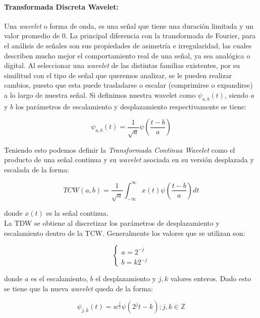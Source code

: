 \documentclass[11pt]{article}
\begin{document}
\paragraph*{Transformada Discreta Wavelet:}
Una {\it wavelet} o forma de onda, es una señal que tiene una duración limitada y un valor promedio de 0. La principal diferencia con la transformada de Fourier, para el análisis de señales son sus propiedades de asimetría e irregularidad, las cuales describen 
mucho mejor el comportamiento real de una señal, ya sea analógica o digital. Al seleccionar una {\it wavelet} de las distintas familias existentes, por su similitud con el tipo de señal que queremos analizar, se le pueden realizar cambios, puesto que esta puede trasladarse 
o escalar (comprimirse o expandirse) a lo largo de nuestra señal. Si definimos nuestra wavelet como \(\psi_{a, b}(t)\), siendo \(a\) y \(b\) los parámetros de escalamiento y desplazamiento respectivamente se tiene:

\begin{equation*}
    \psi_{a,b}(t) = \frac{1}{\sqrt{a}}\psi(\frac{t - b}{a})
\end{equation*}

Teniendo esto podemos definir la {\it Transformada Continua Wavelet} como el producto de una señal continua y su {\it wavelet} asociada en su versión desplazada y escalada de la forma:

\begin{equation*}
    TCW(a, b) = \frac{1}{\sqrt{a}}\int_{-\infty}^{\infty}x(t)\psi(\frac{t - b}{a})dt
\end{equation*}

donde \(x(t)\) es la señal continua.\\
La TDW se obtiene al discretizar los parámetros de desplazamiento y escalamiento dentro de la TCW. Generalmente los valores que se utilizan son:

\begin{equation*}
    \begin{cases}
        a=2^{-j}\\
        b=k2^{-j}
    \end{cases}
\end{equation*}

donde \(a\) es el escalamiento, \(b\) el desplazamiento y \(j, k\) valores enteros. Dado esto se tiene que la nueva {\it wavelet} queda de la forma:

\begin{equation*}
    \psi_{j, k}(t)= w^{\frac{j}{2}}\psi(2^{j}t - k); j, k \in \mathbb{Z}
\end{equation*}
\end{document}
